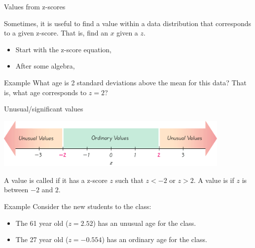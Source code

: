 \documentclass[xcolor=table, aspectratio=169, bigger]{beamer}
\begin{document}
\begin{frame}{Values from z-scores}
\begin{block}{}
Sometimes, it is useful to find a value within a data distribution that corresponds to a given z-score. That is, find an $x$ given a $z$. 
\medskip
\begin{itemize}
\pause\item Start with the z-score equation, \\
\smallskip
{}
\pause\item After some algebra,\\
\smallskip
{}
\end{itemize}
\end{block}

\pause
\begin{exampleblock}{Example}
What age is 2 standard deviations above the mean for this data? That is, what age corresponds to $z=2$?\\
\smallskip
\pause
{}
\end{exampleblock}
\end{frame}

\begin{frame}{Unusual/significant values}

{\centering
\includegraphics[width=4.5in]{../images/ch03_unusual} \par
}

\begin{block}{}
A value is called  if it has a z-score $z$ such that $z< -2$ or $z > 2$. A value is  if $z$ is between $-2$ and $2$.
\end{block}

\pause
\begin{exampleblock}{Example}
Consider the new students to the class:
\begin{itemize}
\item The 61 year old ($z=2.52$) has an unusual age for the class. 
\item The 27 year old ($z=-0.554$) has an ordinary age for the class.
\end{itemize}
\end{exampleblock}
\end{frame}
\end{document}
